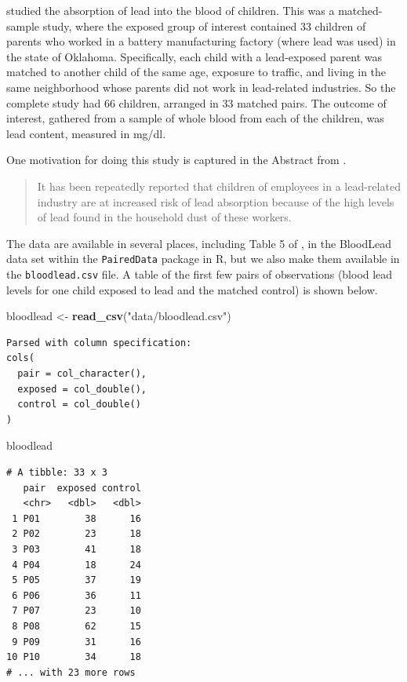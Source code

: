 \documentclass[
]{book}
\newenvironment{Shaded}{\begin{snugshade}}{\end{snugshade}}
\newcommand{\KeywordTok}[1]{\textcolor[rgb]{0.13,0.29,0.53}{\textbf{#1}}}
\newcommand{\NormalTok}[1]{#1}
\newcommand{\StringTok}[1]{\textcolor[rgb]{0.31,0.60,0.02}{#1}}
\begin{document}
\citet{Morton1982} studied the absorption of lead into the blood of children. This was a matched-sample study, where the exposed group of interest contained 33 children of parents who worked in a battery manufacturing factory (where lead was used) in the state of Oklahoma. Specifically, each child with a lead-exposed parent was matched to another child of the same age, exposure to traffic, and living in the same neighborhood whose parents did not work in lead-related industries. So the complete study had 66 children, arranged in 33 matched pairs. The outcome of interest, gathered from a sample of whole blood from each of the children, was lead content, measured in mg/dl.

One motivation for doing this study is captured in the Abstract from \citet{Morton1982}.

\begin{quote}
It has been repeatedly reported that children of employees in a lead-related industry are at increased risk of lead absorption because of the high levels of lead found in the household dust of these workers.
\end{quote}

The data are available in several places, including Table 5 of \citet{Pruzek2009}, in the BloodLead data set within the \texttt{PairedData} package in R, but we also make them available in the \texttt{bloodlead.csv} file. A table of the first few pairs of observations (blood lead levels for one child exposed to lead and the matched control) is shown below.

\begin{Shaded}
\begin{Highlighting}[]
\NormalTok{bloodlead <-}\StringTok{ }\KeywordTok{read_csv}\NormalTok{(}\StringTok{"data/bloodlead.csv"}\NormalTok{)}
\end{Highlighting}
\end{Shaded}

\begin{verbatim}
Parsed with column specification:
cols(
  pair = col_character(),
  exposed = col_double(),
  control = col_double()
)
\end{verbatim}

\begin{Shaded}
\begin{Highlighting}[]
\NormalTok{bloodlead}
\end{Highlighting}
\end{Shaded}

\begin{verbatim}
# A tibble: 33 x 3
   pair  exposed control
   <chr>   <dbl>   <dbl>
 1 P01        38      16
 2 P02        23      18
 3 P03        41      18
 4 P04        18      24
 5 P05        37      19
 6 P06        36      11
 7 P07        23      10
 8 P08        62      15
 9 P09        31      16
10 P10        34      18
# ... with 23 more rows
\end{verbatim}
\end{document}
